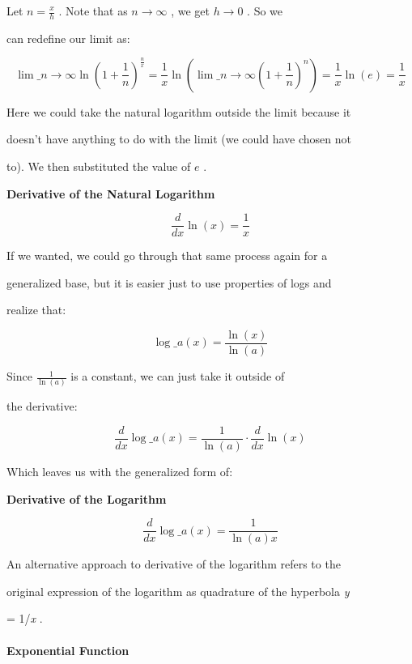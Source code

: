 Let $n=\frac{x}{h}$ . Note that as $n\to\infty$ , we get $h\to0$ . So we

can redefine our limit as:



$$\lim\_{n\to\infty}\ln\left(1+\frac{1}{n}\right)^\frac{n}{x}=\frac{1}{x}\ln\left(\lim\_{n\to\infty}\left(1+\frac{1}{n}\right)^n\right)=\frac{1}{x}\ln(e)=\frac{1}{x}$$



Here we could take the natural logarithm outside the limit because it

doesn't have anything to do with the limit (we could have chosen not

to). We then substituted the value of $e$ .



\textbf{Derivative of the Natural Logarithm}

$$\frac{d}{dx}\ln(x)=\frac{1}{x}$$         



If we wanted, we could go through that same process again for a

generalized base, but it is easier just to use properties of logs and

realize that:



$$\log\_a(x)=\frac{\ln(x)}{\ln(a)}$$



Since $\frac{1}{\ln(a)}$ is a constant, we can just take it outside of

the derivative:



$$\frac{d}{dx}\log\_a(x)=\frac{1}{\ln(a)}\cdot\frac{d}{dx}\ln(x)$$



Which leaves us with the generalized form of:



 \textbf{Derivative of the Logarithm}

 $$\frac{d}{dx}\log\_a(x)=\frac{1}{\ln(a)x}$$ 



An alternative approach to derivative of the logarithm refers to the

original expression of the logarithm as quadrature of the hyperbola \textit{y}

= 1/\textit{x} .



\paragraph{Exponential Function}




